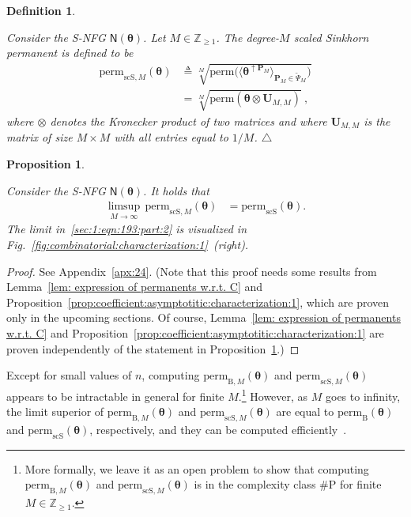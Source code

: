 \documentclass[journal,lettersize,twocolumn]{IEEEtran} %
\newtheorem{proposition}[theorem]{Proposition}
\newtheorem{definition}[theorem]{Definition}
\newcommand{\edefinition}{\hfill$\triangle$}
\newcommand{\sfN}{ \mathsf{N} }
\newcommand{\sZpp}{\mathbb{Z}_{\geq 1}}
\newcommand{\matr}[1]{ \bm{#1} }
\newcommand{\defeq}{ \triangleq }
\newcommand{\perm}{ \mathrm{perm} }
\newcommand{\permb}{ \mathrm{perm}_{\mathrm{B}} }
\newcommand{\permbM}[1]{\perm_{ \mathrm{B}, #1 }}
\newcommand{\permscs}{ \mathrm{perm}_{\mathrm{scS}} }
\newcommand{\permscsM}[1]{ \mathrm{perm}_{\mathrm{scS},#1} }
\newcommand{\mtheta}{\matr{\theta}}
\newcommand{\mP}{\matr{P}}
\newcommand{\mU}{\matr{U}}
\newcommand{\tPsi}{\tilde{\Psi}}
\begin{document}
%

\begin{definition}
  \label{def:Sinkhorn:degree:M:cover:1}

  Consider the S-NFG $ \sfN(\mtheta) $. Let $M \in \sZpp$.  The degree-$M$
  scaled Sinkhorn permanent is defined to be
  \begin{align}
    \permscsM{M}(\mtheta)
      &\defeq 
         \sqrt[M]{
           \perm
             \bigl(
               \langle
                 \mtheta^{\uparrow \mP_{M}}
               \rangle_{\mP_{M} \in \tPsi_{M} }
             \bigr)
         } \\
      &= \sqrt[M]{
           \perm( \mtheta \otimes \mU_{M,M})
         } \ , \label{eq:def:degree:M:scaled:Sinkhorn:permanent:1}
  \end{align}
  where $\otimes$ denotes the Kronecker product of two matrices and where
  $ \mU_{M,M} $ is the matrix of size $M \times M$ with all entries equal to
  $1/M$.
  \edefinition
\end{definition}

%

\begin{proposition}
  \label{sec:1:prop:14}
    
  Consider the S-NFG $ \sfN(\mtheta) $. It holds that
  \begin{align}
    \limsup_{M \to \infty} \,
      \permscsM{M}(\mtheta)
      &= \permscs(\mtheta). 
            \label{sec:1:eqn:193:part:2}
  \end{align}
  The limit in~\eqref{sec:1:eqn:193:part:2} is visualized in
  Fig.~\ref{fig:combinatorial:characterization:1}~(right).
\end{proposition}

%

\begin{proof}
  See Appendix~\ref{apx:24}. (Note that this proof needs some results from
  Lemma~\ref{lem: expression of permanents w.r.t. C} and
  Proposition~\ref{prop:coefficient:asymptotitic:characterization:1}, which
  are proven only in the upcoming sections. Of course, Lemma~\ref{lem:
    expression of permanents w.r.t. C} and
  Proposition~\ref{prop:coefficient:asymptotitic:characterization:1} are
  proven independently of the statement in Proposition~\ref{sec:1:prop:14}.)
\end{proof}

%

Except for small values of $n$, computing $ \permbM{M}(\mtheta) $ and
$ \permscsM{M}(\mtheta) $ appears to be intractable in general for finite
$M$.\footnote{More formally, we leave it as an open problem to show that
  computing $ \permbM{M}(\mtheta) $ and $ \permscsM{M}(\mtheta) $ is in the
  complexity class \#P for finite $ M \in \sZpp $.} However, as $ M $ goes to
infinity, the limit superior of $ \permbM{M}(\mtheta) $ and
$ \permscsM{M}(\mtheta) $ are equal to $ \permb(\mtheta) $ and
$ \permscs(\mtheta) $, respectively, and they can be computed
efficiently~\cite{Vontobel2013a,Linial2000}.
\end{document}
